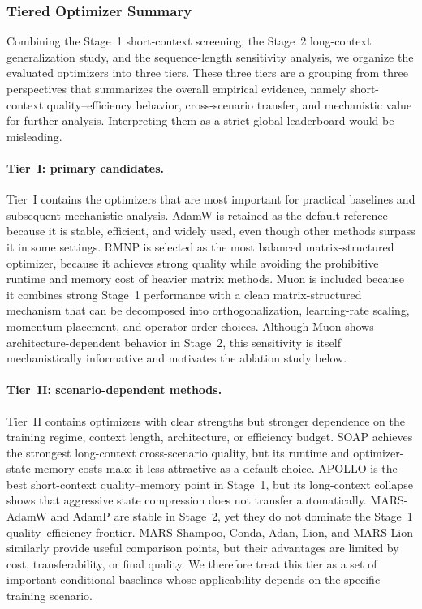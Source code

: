 
\subsubsection{Tiered Optimizer Summary}
\label{sec:benchmark-tiered-summary}

Combining the Stage~1 short-context screening, the Stage~2 long-context
generalization study, and the sequence-length sensitivity analysis, we organize
the evaluated optimizers into three tiers. These three tiers are a grouping
from three perspectives that summarizes the overall empirical evidence, namely
short-context quality--efficiency behavior, cross-scenario transfer, and
mechanistic value for further analysis. Interpreting them as a strict global
leaderboard would be misleading.

\paragraph{Tier~I: primary candidates.}
Tier~I contains the optimizers that are most important for practical baselines
and subsequent mechanistic analysis. AdamW is retained as the default reference
because it is stable, efficient, and widely used, even though other methods surpass it in some settings. RMNP is selected as the most balanced
matrix-structured optimizer, because it achieves strong quality while avoiding the
prohibitive runtime and memory cost of heavier matrix methods. Muon is included
because it combines strong Stage~1 performance with a clean matrix-structured
mechanism that can be decomposed into orthogonalization, learning-rate scaling,
momentum placement, and operator-order choices. Although Muon shows
architecture-dependent behavior in Stage~2, this sensitivity is itself
mechanistically informative and motivates the ablation study below.

\paragraph{Tier~II: scenario-dependent methods.}
Tier~II contains optimizers with clear strengths but stronger dependence on
the training regime, context length, architecture, or efficiency budget. SOAP
achieves the strongest long-context cross-scenario quality, but its runtime and
optimizer-state memory costs make it less attractive as a default choice.
APOLLO is the best short-context quality--memory point in Stage~1, but its
long-context collapse shows that aggressive state compression does not transfer
automatically. MARS-AdamW and AdamP are stable in Stage~2, yet they do not
dominate the Stage~1 quality--efficiency frontier. MARS-Shampoo, Conda, Adan,
Lion, and MARS-Lion similarly provide useful comparison points, but their
advantages are limited by cost, transferability, or final quality. We therefore
treat this tier as a set of important conditional baselines whose applicability
depends on the specific training scenario.

